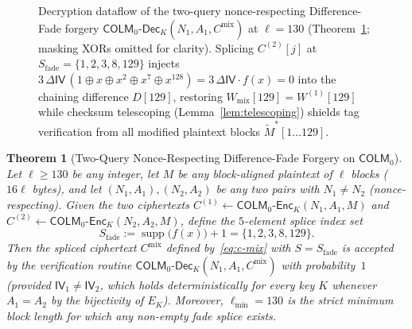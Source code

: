\documentclass[11pt,a4paper]{article}
\newtheorem{theorem}{Theorem}
\theoremstyle{definition}
\theoremstyle{remark}
\newcommand{\COLMzero}{\mathsf{COLM}_0}
\newcommand{\IV}{\mathsf{IV}}
\newcommand{\CS}{\mathsf{CS}}
\newcommand{\supp}{\operatorname{supp}}
\begin{document}
\begin{figure}[t!]
\caption{Decryption dataflow of the two-query nonce-respecting Difference-Fade forgery $\mathsf{COLM}_0\text{-}\mathsf{Dec}_K(N_1, A_1, C^{\mathrm{mix}})$ at $\ell = 130$ (Theorem~\ref{thm:fade}; masking XORs omitted for clarity). Splicing $C^{(2)}[j]$ at $S_{\mathrm{fade}} = \{1, 2, 3, 8, 129\}$ injects $3\,\Delta\IV\,(1 \oplus x \oplus x^2 \oplus x^7 \oplus x^{128}) = 3\,\Delta\IV \cdot f(x) = 0$ into the chaining difference $D[129]$, restoring $W_{\mathrm{mix}}[129] = W^{(1)}[129]$ while checksum telescoping (Lemma~\ref{lem:telescoping}) shields tag verification from all modified plaintext blocks $\tilde{M}^*[1 \dots 129]$.}
\label{fig:fade-attack}
\end{figure}

\begin{theorem}[Two-Query Nonce-Respecting Difference-Fade Forgery on $\COLMzero$]
\label{thm:fade}
Let $\ell \ge 130$ be any integer, let $M$ be any block-aligned plaintext of $\ell$ blocks ($16\ell$ bytes), and let $(N_1, A_1), (N_2, A_2)$ be any two pairs with $N_1 \neq N_2$ (nonce-respecting). Given the two ciphertexts $C^{(1)} \leftarrow \mathsf{COLM}_0\text{-}\mathsf{Enc}_K(N_1, A_1, M)$ and $C^{(2)} \leftarrow \mathsf{COLM}_0\text{-}\mathsf{Enc}_K(N_2, A_2, M)$, define the $5$-element splice index set
\begin{equation}
\label{eq:S-fade}
S_{\mathrm{fade}} := \supp\big(f(x)\big) + 1 = \{1, 2, 3, 8, 129\}.
\end{equation}
Then the spliced ciphertext $C^{\mathrm{mix}}$ defined by~\eqref{eq:c-mix} with $S = S_{\mathrm{fade}}$ is accepted by the verification routine $\mathsf{COLM}_0\text{-}\mathsf{Dec}_K(N_1, A_1, C^{\mathrm{mix}})$ with probability~$1$ (provided $\IV_1 \neq \IV_2$, which holds deterministically for every key $K$ whenever $A_1 = A_2$ by the bijectivity of $E_K$). Moreover, $\ell_{\min} = 130$ is the strict minimum block length for which any non-empty fade splice exists.
\end{theorem}
\end{document}
